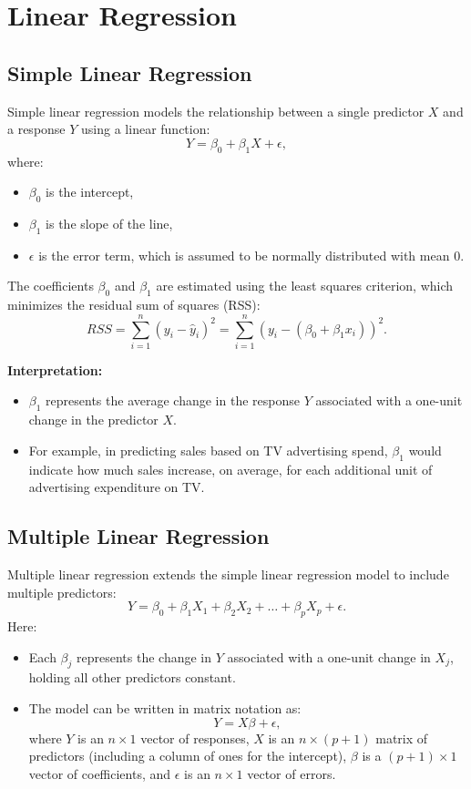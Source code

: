 \documentclass{article}
\begin{document}
\pagebreak

\section{Linear Regression}

\subsection{Simple Linear Regression}
Simple linear regression models the relationship between a single predictor \(X\) and a response \(Y\) using a linear function:
\[
Y = \beta_0 + \beta_1 X + \epsilon,
\]
where:
\begin{itemize}
    \item \(\beta_0\) is the intercept,
    \item \(\beta_1\) is the slope of the line,
    \item \(\epsilon\) is the error term, which is assumed to be normally distributed with mean 0.
\end{itemize}
The coefficients \(\beta_0\) and \(\beta_1\) are estimated using the least squares criterion, which minimizes the residual sum of squares (RSS):
\[
RSS = \sum_{i=1}^{n} (y_i - \hat{y}_i)^2 = \sum_{i=1}^{n} (y_i - (\beta_0 + \beta_1 x_i))^2.
\]

\textbf{Interpretation:} 
\begin{itemize}
    \item \(\beta_1\) represents the average change in the response \(Y\) associated with a one-unit change in the predictor \(X\).
    \item For example, in predicting sales based on TV advertising spend, \(\beta_1\) would indicate how much sales increase, on average, for each additional unit of advertising expenditure on TV.
\end{itemize}

\subsection{Multiple Linear Regression}
Multiple linear regression extends the simple linear regression model to include multiple predictors:
\[
Y = \beta_0 + \beta_1 X_1 + \beta_2 X_2 + \ldots + \beta_p X_p + \epsilon.
\]
Here:
\begin{itemize}
    \item Each \(\beta_j\) represents the change in \(Y\) associated with a one-unit change in \(X_j\), holding all other predictors constant.
    \item The model can be written in matrix notation as:
    \[
    Y = X\beta + \epsilon,
    \]
    where \(Y\) is an \(n \times 1\) vector of responses, \(X\) is an \(n \times (p+1)\) matrix of predictors (including a column of ones for the intercept), \(\beta\) is a \((p+1) \times 1\) vector of coefficients, and \(\epsilon\) is an \(n \times 1\) vector of errors.
\end{itemize}
\end{document}
